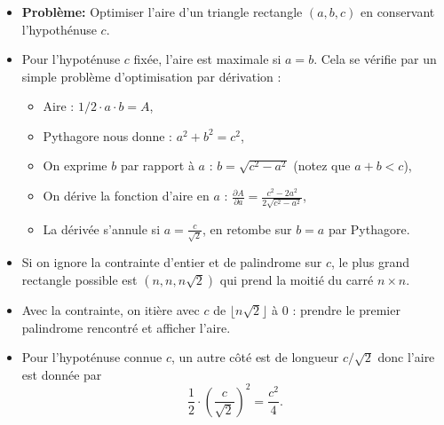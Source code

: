 \begin{frame}
    \frametitle{\problemtitle}
    \begin{itemize}
        \item<+-> \textbf{Problème:} Optimiser l'aire d'un triangle rectangle $(a,b,c)$ en conservant l'hypothénuse $c$.
        \item<+-> Pour l'hypoténuse $c$ fixée, l'aire est maximale si $a=b$. Cela se vérifie par un simple problème d'optimisation par dérivation :
        \begin{itemize}
            \item Aire : $1/2 \cdot a\cdot b = A$,
            \item Pythagore nous donne : $a^2 + b^2 = c^2$,
            \item On exprime $b$ par rapport à $a$ : $b = \sqrt{c^2 - a^2}$ (notez que $a+b<c$),
            \item On dérive la fonction d'aire en $a$ : $\frac{\partial A}{\partial a} = \frac{c^2-2a^2}{2\sqrt{c^2-a^2}}$,
            \item La dérivée s'annule si $a=\frac{c}{\sqrt{2}}$, en retombe sur $b=a$ par Pythagore.
        \end{itemize}
        \item<+-> Si on ignore la contrainte d'entier et de palindrome sur $c$, le plus grand rectangle possible est $(n,n,n\sqrt{2})$ qui prend la moitié du carré $n\times n$.
        \item<+-> Avec la contrainte, on itière avec $c$ de $\lfloor n\sqrt{2} \rfloor$ à $0$ : prendre le premier palindrome rencontré et afficher l'aire.
        \item<+-> Pour l'hypoténuse connue $c$, un autre côté est de longueur $c/\sqrt{2}$ donc l'aire est donnée par \[\frac{1}{2}\cdot\left(\frac{c}{\sqrt{2}}\right)^2 = \frac{c^2}{4}.\]

    \end{itemize}
    \solvestats
\end{frame}
